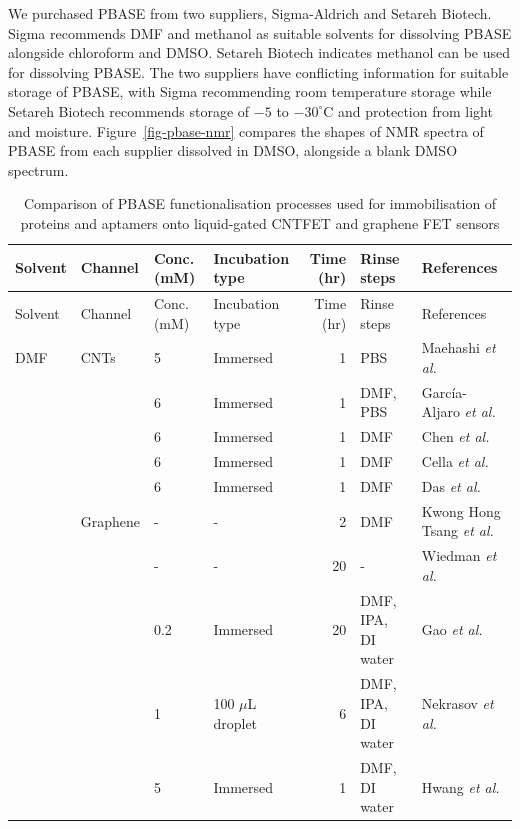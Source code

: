 \documentclass[
  a4paper,
]{scrbook}
\begin{document}
We purchased PBASE from two suppliers, Sigma-Aldrich and Setareh
Biotech. Sigma recommends DMF and methanol as suitable solvents for
dissolving PBASE alongside chloroform and DMSO. Setareh Biotech
indicates methanol can be used for dissolving PBASE. The two suppliers
have conflicting information for suitable storage of PBASE, with Sigma
recommending room temperature storage while Setareh Biotech recommends
storage of \(-5\) to \(-30 ^\circ \text{C}\) and protection from light
and moisture. Figure~\ref{fig-pbase-nmr} compares the shapes of NMR
spectra of PBASE from each supplier dissolved in DMSO, alongside a blank
DMSO spectrum.

\newpage
{}

\hypertarget{tbl-pbase-functionalisation}{}
\begin{longtable}[]{@{}llllrll@{}}
\caption{\label{tbl-pbase-functionalisation}Comparison of PBASE
functionalisation processes used for immobilisation of proteins and
aptamers onto liquid-gated CNTFET and graphene FET
sensors}\tabularnewline
\toprule()
Solvent & Channel & Conc. (mM) & Incubation type & Time (hr) & Rinse
steps & References \\
\midrule()
\endfirsthead
\toprule()
Solvent & Channel & Conc. (mM) & Incubation type & Time (hr) & Rinse
steps & References \\
\midrule()
\endhead
DMF & CNTs & 5 & Immersed & 1 & PBS & Maehashi \textit{et al.}
\cite{Maehashi2007} \\
& & 6 & Immersed & 1 & DMF, PBS & García-Aljaro \textit{et al.}
\cite{Garcia-Aljaro2010} \\
& & 6 & Immersed & 1 & DMF & Chen \textit{et al.} \cite{Chen2001} \\
& & 6 & Immersed & 1 & DMF & Cella \textit{et al.} \cite{Cella2010} \\
& & 6 & Immersed & 1 & DMF & Das \textit{et al.} \cite{Das2011} \\
& Graphene & - & - & 2 & DMF & Kwong Hong Tsang \textit{et al.}
\cite{KwongHongTsang2019} \\
& & - & - & 20 & - & Wiedman \textit{et al.} \cite{Wiedman2017} \\
& & 0.2 & Immersed & 20 & DMF, IPA, DI water & Gao \textit{et al.}
\cite{Gao2018} \\
& & 1 & 100 \(\mu\)L droplet & 6 & DMF, IPA, DI water & Nekrasov
\textit{et al.} \cite{Nekrasov2021} \\
& & 5 & Immersed & 1 & DMF, DI water & Hwang \textit{et al.}
\cite{Hwang2016} \\

\end{longtable}
\end{document}
